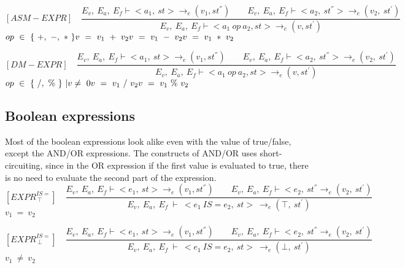    	\[
   	[ASM-EXPR] \quad
   	\dfrac{E_v, \ E_a, \ E_f \vdash <a_1, \ st> \rightarrow_{e} (v_1, st^{''}) \qquad E_v, \ E_a, \ E_f \vdash <a_2, \ st^{''}> \rightarrow_e (v_2, \ st^{'})}{E_v, \ E_a, \ E_f \vdash <a_1 \ op \ a_2, st> \rightarrow_{e} (v, st^{'})}
   	\]
 	\begin{math}
 	op \ \in \ \{ \ +, \ -, \ * \ \} \newline
   	v \ = \ v_1 \ + \ v_2 \newline
   	v \ = \ v_1 \ - \ v_2 \newline
   	v \ = \ v_1 \ * \ v_2
   	\end{math}
   	
   	\[
   	[DM-EXPR] \quad
   	\dfrac{E_v, \ E_a, \ E_f \vdash <a_1, \ st> \rightarrow_{e} (v_1, st^{''}) \qquad E_v, \ E_a, \ E_f \vdash <a_2, \ st^{''}> \rightarrow_e (v_2, \ st^{'})}{E_v, \ E_a, \ E_f \vdash <a_1 \ op \ a_2, st> \rightarrow_{e} (v, st^{'})}
   	\]
   	\begin{math}
   	op \ \in \ \{ \ /, \ \% \ \} \ | v \not= \ 0 \newline 
   	v \ = \ v_1 \ / \ v_2 \newline
   	v \ = \ v_1 \ \% \ v_2
   	\end{math}   	   	   	

   	\subsection{Boolean expressions}
   	Most of the boolean expressions look alike even with the value of true/false, except the AND/OR expressions. The constructs of AND/OR uses short-circuiting, since in the OR expression if the first value is evaluated to true, there is no need to evaluate the second part of the expression.
   	\[
   	[EXPR^{IS=}_{\ \top}] \quad
   	\dfrac{E_v, \ E_a, \ E_f \vdash <e_1, \ st> \rightarrow_e (v_1, st^{''}) \qquad E_v, \ E_a, \ E_f \vdash <e_2, \ st^{''} \rightarrow_e (v_2, \ st^{'})}{E_v, \ E_a, \ E_f \ \vdash \ <e_1
   	\ IS= e_2, \ st> \ \rightarrow_e (\top, \ st^{'})}
   	\]
   	\begin{math}
   	v_1 \ = \ v_2 
   	\end{math}

   	\[
   	[EXPR^{IS=}_{\ \bot}] \quad
   	\dfrac{E_v, \ E_a, \ E_f \vdash <e_1, \ st> \rightarrow_e (v_1, st^{''}) \qquad E_v, \ E_a, \ E_f \vdash <e_2, \ st^{''} \rightarrow_e (v_2, \ st^{'})}{E_v, \ E_a, \ E_f \ \vdash \ <e_1
   	\ IS= e_2, \ st> \ \rightarrow_e (\bot, \ st^{'})}
   	\]
	\begin{math}
   	v_1 \ \not= \ v_2
   	\end{math}


